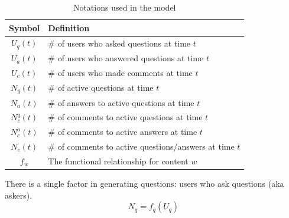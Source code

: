 \begin{table}[thb]
	\centering
    \vspace{-0.5\baselineskip}
	\begin{tabular}{cl}
	\hline \textbf{Symbol} & \textbf{Definition}\\ \hline
	$U_q(t)$ & \# of users who asked questions at time $t$\\ 
	$U_a(t)$ & \# of users who answered questions at time $t$\\
	$U_c(t)$ & \# of users who made comments at time $t$\\
	$N_q(t)$ & \# of active questions at time $t$\\
	$N_a(t)$ & \# of answers to active questions at time $t$\\
	$N_c^q(t)$ & \# of comments to active questions at time $t$\\
	$N_c^a(t)$ & \# of comments to active answers at time $t$\\
    $N_c(t)$ & \# of comments to active questions/answers at time $t$\\
	$f_w$ & The functional relationship for content $w$\\ \hline
	\end{tabular}
    \caption{Notations used in the model}
    \vspace{-2\baselineskip}
    \label{tab:notations}
\end{table}

There is a single factor in generating questions: users who ask questions (aka askers).
\begin{equation*}
N_q = f_q(U_q)
\end{equation*}

